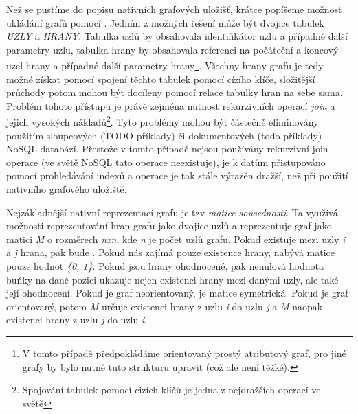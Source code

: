 Než se pustíme do popisu nativních grafových uložišť, krátce popíšeme možnost ukládání grafů pomocí . Jedním z možných řešení může být dvojice tabulek \textit{UZLY} a \textit{HRANY}. Tabulka uzlů by obsahovala identifikátor uzlu a případné další parametry uzlu, tabulka hrany by obsahovala referenci na počáteční a koncový uzel hrany a případné další parametry hrany\footnote{V tomto případě předpokládáme orientovaný prostý atributový graf, pro jiné grafy by bylo nutné tuto strukturu upravit (což ale není těžké).}. Všechny hrany grafu je tedy možné získat pomocí spojení těchto tabulek pomocí cízího klíče, složitější průchody potom mohou být docíleny pomocí relace tabulky hran na sebe sama. Problém tohoto přístupu je právě zejména nutnost rekurzivních operací \textit{join} a jejich vysokých nákladů\footnote{Spojování tabulek pomocí cizích klíčů je jedna z nejdražších operací ve světě }. Tyto problémy mohou být částečně eliminovány použitím sloupcových (TODO příklady) či dokumentových (todo příklady) NoSQL databází. Přestože v tomto případě nejsou používány rekurzivní join operace (ve světě NoSQL tato operace neexistuje), je k datům přistupováno pomocí prohledávání indexů a operace je tak stále výrazěn dražší, než při použití nativního grafového uložiště.\cite{Lal15} 

Nejzákladnější nativní reprezentací grafu je tzv \textit{matice sousednosti}. Ta využívá možnosti reprezentování hran grafu jako dvojice uzlů a reprezentuje graf jako matici \textit{M} o rozměrech \textit{nxn}, kde \textit{n} je počet uzlů grafu. Pokud existuje mezi uzly \textit{i} a \textit{j} hrana, pak bude . Pokud nás zajímá pouze existence hrany, nabývá matice pouze hodnot \textit{\{0, 1\}}. Pokud jsou hrany ohodnocené, pak nenulová hodnota buňky na dané pozici ukazuje nejen existenci hrany mezi danými uzly, ale také její ohodnocení. Pokud je graf neorientovaný, je matice symetrická. Pokud je graf orientovaný, potom \textit{M} určuje existenci hrany z uzlu \textit{i} do uzlu \textit{j} a \textit{M} naopak existenci hrany z uzlu \textit{j} do uzlu \textit{i}.

